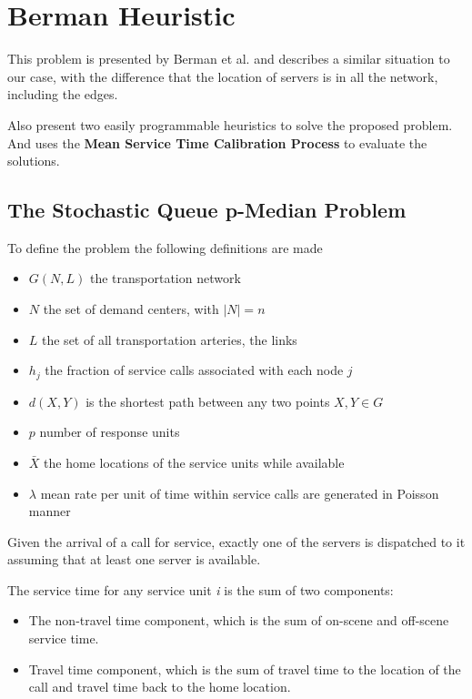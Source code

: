 \chapter{Berman Heuristic}
\label{ch:Berman}
This problem is presented by Berman et al. \cite{berman1987stochastic}
and describes a similar situation to our case,
with the difference
that the location of servers
is in all the network,
including the edges.

Also present two easily programmable heuristics
to solve the proposed problem.
And uses the \textbf{Mean Service Time Calibration Process}
to evaluate the solutions.

\section{The Stochastic Queue p-Median Problem}
To define the problem
the following definitions are made
\begin{itemize}
\item $G(N,L)$ the transportation network
\item $N$ the set of demand centers,
  with $|N| = n$
\item $L$ the set of all transportation arteries,
  the links
\item $h_j$ the fraction of service calls
  associated with each node $j$
\item $d(X,Y)$ is the shortest path between any two points $X,Y \in G$
\item $p$ number of response units
\item $\bar{X}$ the home locations of the service units while available
\item $\lambda$ mean rate per unit of time
  within service calls are generated in Poisson manner
\end{itemize}

Given the arrival of a call for service,
exactly one of the servers is dispatched to it
assuming that at least one server is available.

The service time for any service unit \textit{i}
is the sum of two components:
\begin{itemize}
\item The non-travel time component,
  which is the sum of
  on-scene and off-scene service time.
\item Travel time component,
  which is the sum of travel time
  to the location of the call
  and travel time back to the home location.
\end{itemize}

